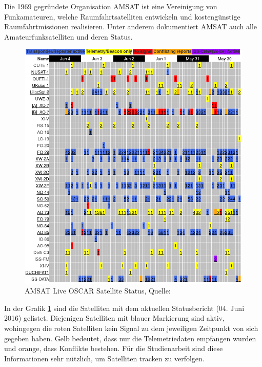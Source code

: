 \newpage
Die 1969 gegründete Organisation AMSAT ist eine Vereinigung von Funkamateuren, welche Raumfahrtsatelliten entwickeln und kostengünstige 
Raumfahrtmissionen realisieren. Unter anderem dokumentiert AMSAT auch alle Amateurfunksatelliten und deren Status. 
\begin{figure}[h]
 \centering
 \includegraphics[width=0.65\linewidth]{./images/amsatlist}
 \caption{AMSAT Live OSCAR Satellite Status, Quelle: \cite{amsat}}
 \label{fig:amsat}
\end{figure}
In der Grafik \ref{fig:amsat} sind die Satelliten mit dem aktuellen Statusbericht (04. Juni 2016) gelistet. Diejenigen Satelliten mit blauer 
Markierung sind aktiv, wohingegen die roten Satelliten kein Signal zu dem jeweiligen Zeitpunkt von sich gegeben haben. Gelb bedeutet, dass nur die 
Telemetriedaten empfangen wurden und orange, dass Konflikte bestehen. Für die Studienarbeit sind diese Informationen sehr nützlich, um Satelliten 
tracken zu verfolgen. 
